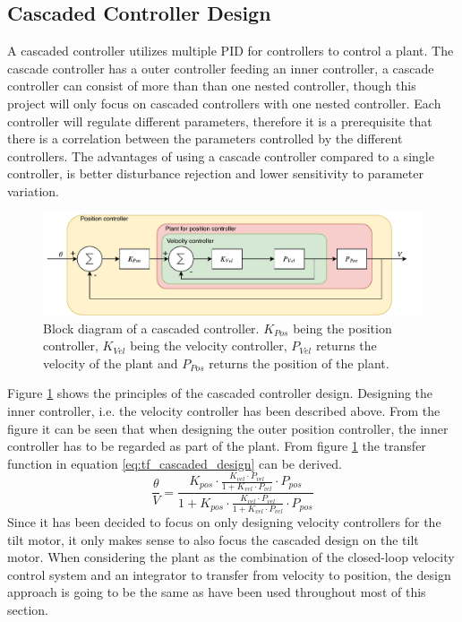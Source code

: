 \documentclass[../../main.tex]{subfiles}
\begin{document}
\subsection{Cascaded Controller Design}
A cascaded controller utilizes multiple PID for controllers to control a plant. The cascade controller has a outer controller feeding an inner controller, a cascade controller can consist of more than than one nested controller, though this project will only focus on cascaded controllers with one nested controller. Each controller will regulate different parameters, therefore it is a prerequisite that there is a correlation between the parameters controlled by the different controllers. The advantages of using a cascade controller compared to a single controller, is better disturbance rejection and lower sensitivity to parameter variation. 
\begin{figure}[H]
    \centering
    \includegraphics[width = 0.7 \textwidth]{Sections/System_Design/Images/cascade_controller.pdf}
    \caption{Block diagram of a cascaded controller. $K_{Pos}$ being the position controller, $K_{Vel}$ being the velocity controller, $P_{Vel}$ returns the velocity of the plant and $P_{Pos}$ returns the position of the plant.}
    \label{fig:cascaded_design}
\end{figure}
Figure \ref{fig:cascaded_design} shows the principles of the cascaded controller design. Designing the inner controller, i.e. the velocity controller has been described above. From the figure it can be seen that when designing the outer position controller, the inner controller has to be regarded as part of the plant. From figure \ref{fig:cascaded_design} the transfer function in equation \ref{eq:tf_cascaded_design} can be derived.
\begin{equation} \label{eq:tf_cascaded_design}
    \frac{\theta}{V}=\frac{K_{pos}\cdot\frac{K_{vel}\cdot P_{vel}}{1+K_{vel}\cdot P_{vel}}\cdot P_{pos}}{1+ K_{pos}\cdot\frac{K_{vel}\cdot P_{vel}}{1+K_{vel}\cdot P_{vel}}\cdot P_{pos}}
\end{equation}
Since it has been decided to focus on only designing velocity controllers for the tilt motor, it only makes sense to also focus the cascaded design on the tilt motor.
When considering the plant as the combination of the closed-loop velocity control system and an integrator to transfer from velocity to position, the design approach is going to be the same as have been used throughout most of this section. 
\end{document}
